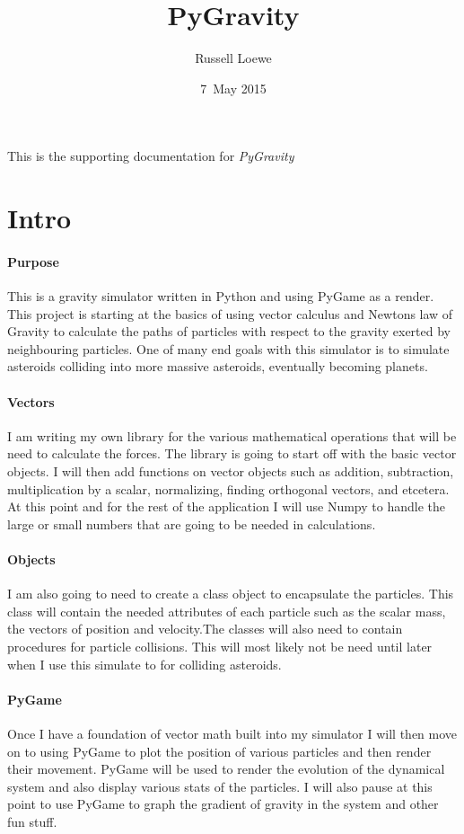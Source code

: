 \documentclass[15pt]{report}
\title{PyGravity}
\author{Russell Loewe}
\date{7~May 2015}
\begin{document}
\maketitle


\indent
This is the supporting documentation for
\textit{PyGravity} 


\section{Intro}
\indent \paragraph{Purpose} This is a gravity simulator written in Python and using PyGame as a render. This project is starting at the basics of using vector calculus and Newtons law of Gravity to calculate the paths of particles with respect to the gravity exerted by neighbouring particles. One of many end goals with this simulator is to simulate asteroids colliding into more massive asteroids, eventually becoming planets.
\indent \paragraph{Vectors}I am writing my own library for  the various mathematical operations that will be need to calculate the forces. The library is going to start off with the basic vector objects. I will then add functions on vector objects such as addition, subtraction, multiplication by a scalar, normalizing, finding orthogonal vectors, and etcetera. At this point and for the rest of the application I will use Numpy to handle the large or small numbers that are going to be needed in calculations.
\indent \paragraph{Objects} I am also going to need to create a class object to encapsulate the particles. This class will contain the needed attributes of each particle such as the scalar mass, the vectors of position and velocity.The classes will also need to contain procedures for particle collisions. This will most likely not be need until later when I use this simulate to for colliding asteroids.
\indent \paragraph{PyGame} Once I have a foundation of vector math built into my simulator I will then move on to using PyGame to plot the position of various particles and then render their movement. PyGame will be used to render the evolution of the dynamical system and also display various stats of the particles. I will also pause at this point to use PyGame to graph the gradient of gravity in the system and other fun stuff.
\end{document}

